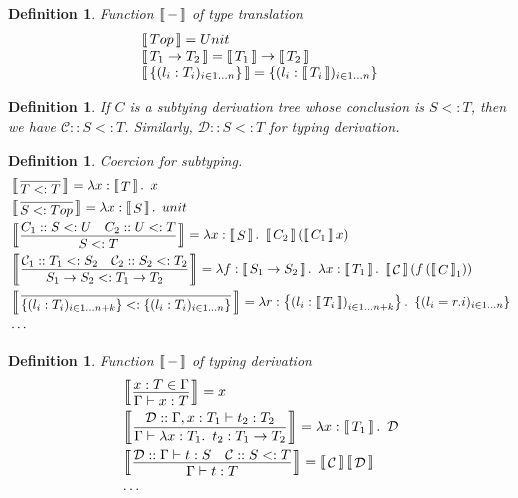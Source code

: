 \documentclass{article}
\theoremstyle{plain}
\newtheorem{definition}[theorem]{Definition}
\theoremstyle{nonumberplain}
\newcommand{\lam}[2]{\ensuremath{\lambda #1\ldotp~ #2}} %
\newcommand{\termtype}[2]{\ensuremath{#1:#2}}
\newcommand{\subtyp}[2]{#1<:#2}
\newcommand{\dbracket}[1]{\ensuremath{\left\llbracket\,\vcenter{\hbox{$#1$}}\,\right\rrbracket}}
\begin{document}
\begin{definition}
\rm Function $\dbracket{-}$ of type translation
$$
\begin{array}{ll}
\dbracket{Top} = Unit \\
\dbracket{T_1 \to T_2} = \dbracket{T_1} \to \dbracket{T_2} \\
\dbracket{\{(l_i:T_i)_{i \in 1 \ldots n}\}} = \left\{(l_i:\dbracket{T_i})_{i \in 1 \ldots n}\right\} 
\end{array}
$$
\end{definition}


\begin{definition}
\rm If $C$ is a subtying derivation tree whose conclusion is $\subtyp{S}{T}$, then we have $\mathcal{C}::\subtyp{S}{T}$. Similarly, $\mathcal{D}::\subtyp{S}{T}$ for typing derivation. 
\end{definition}

\begin{definition}
\rm Coercion for subtyping.
$$
\begin{aligned}
&\dbracket{\infer{\subtyp{T}{T}}{}} =  \lam{\termtype{x}{\dbracket{T}}}{x} \\
&\dbracket{\infer{\subtyp{S}{Top}}{}} =  \lam{\termtype{x}{\dbracket{S}}}{unit} \\
&\dbracket{\infer{\subtyp{S}{T}}{C_1:: \subtyp{S}{U} & C_2:: \subtyp{U}{T}}} =  \lam{\termtype{x}{\dbracket{S}}}{\dbracket{C_2}\left(\dbracket{C_1}x\right)} \\
&\dbracket{\infer{\subtyp{S_1 \to S_2}{T_1 \to T_2}}{\mathcal{C}_1:: \subtyp{T_1}{S_2} & \mathcal{C}_2:: \subtyp{S_2}{T_2}}} = \lam{\termtype{f}{\dbracket{S_1 \to S_2}}}{\lam{\termtype{x}{\dbracket{T_1}}}{\dbracket{\mathcal{C}}\left(f\left(\dbracket{C}_1\right)\right)}}\\
&\dbracket{\infer{\subtyp{\{(l_i:T_i)_{i \in 1 \ldots n+k}\}}{\{(l_i:T_i)_{i \in 1 \ldots n}\}}}{}} = \lam{\termtype{r}{\left\{\left(l_i:\dbracket{T_i}\right)_{i \in 1 \ldots n+k}\right\}}}{\{(l_i=r.i)_{i \in 1 \ldots n}\}} \\
&\cdots
\end{aligned}
$$
\end{definition}

\begin{definition}
\rm Function $\dbracket{-}$ of typing derivation
$$
\begin{aligned}
& \dbracket{\infer{\Gamma \vdash \termtype{x}{T}}{\termtype{x}{T} \in \Gamma}} = x \\
& \dbracket{\infer{\Gamma \vdash \termtype{\lam{\termtype{x}{T_1}}{t_2}}{T_1 \to T_2}}{\mathcal{D}:: \Gamma,\termtype{x}{T_1} \vdash \termtype{t_2}{T_2}}} = \lam{\termtype{x}{\dbracket{T_1}}}{\mathcal{D}}\\
&\dbracket{\infer{\Gamma \vdash \termtype{t}{T}}{\mathcal{D}:: \Gamma \vdash \termtype{t}{S} & \mathcal{C}::\subtyp{S}{T}}} = \dbracket{\mathcal{C}}\dbracket{\mathcal{D}}\\
&\cdots
\end{aligned}
$$
\end{definition}
\end{document}
